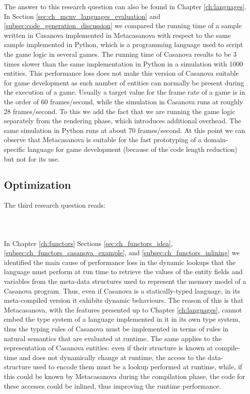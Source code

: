 The answer to this research question can also be found in Chapter \ref{ch:languages}. In Section  \ref{sec:ch_mcnv_languages_evaluation} and \ref{subsec:code_generation_discussion} we compared the running time of a sample written in Casanova implemented in Metacasanova with respect to the same sample implemented in Python, which is a programming language used to script the game logic in several games. The running time of Casanova results to be 3 times slower than the same implementation in Python in a simulation with 1000 entities. This performance loss does not make this version of Casanova suitable for game development as such number of entities can normally be present during the execution of a game. Usually a target value for the frame rate of a game is in the order of 60 frames/second, while the simulation in Casanova runs at roughly 28 frames/second. To this we add the fact that we are running the game logic separately from the rendering phase, which introduces additional overhead. The same simulation in Python runs at about 70 frames/second. At this point we can observe that Metacasanova is suitable for the fast prototyping of a domain-specific language for game development (because of the code length reduction) but not for its use.
\newpage

\subsection{Optimization}
\label{subsec:ch_conclusion_rq3}
The third research question reads:\\\\
\\\\

In Chapter \ref{ch:functors} Sections \ref{sec:ch_functors_idea}, \ref{subsec:ch_functors_casanova_example}, and \ref{subsec:ch_functors_inlining} we identified the main cause of performance loss in the dynamic lookups that the language must perform at run time to retrieve the values of the entity fields and variables from the meta-data structures used to represent the memory model of a Casanova program. Thus, even if Casanova is a statically-typed language, in its meta-compiled version it exhibits dynamic behaviours. The reason of this is that Metacasanova, with the features presented up to Chapter \ref{ch:languages}, cannot embed the type system of a language implemented in it in its own type system, thus the typing rules of Casanova must be implemented in terms of rules in natural semantics that are evaluated at runtime. The same applies to the representation of Casanova entities: even if their structure is known at compile-time and does not dynamically change at runtime, the access to the data-structure used to encode them must be a lookup performed at runtime, while, if this could be known by Metacasanova during the compilation phase, the code for these accesses could be inlined, thus improving the runtime performance.

